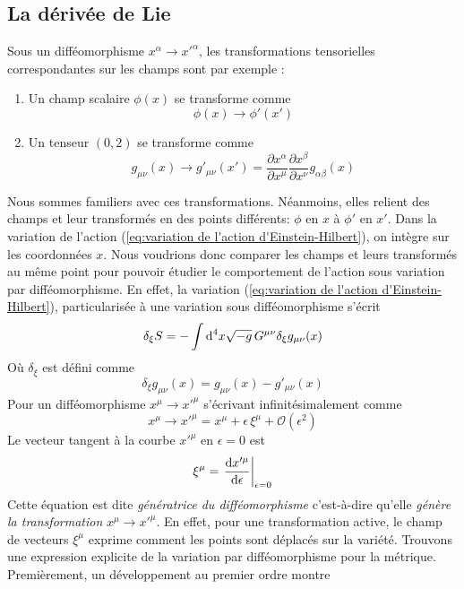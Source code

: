 \subsection{La dérivée de Lie}
Sous un difféomorphisme $x^{\alpha } \to x'^{\alpha }$, les transformations tensorielles correspondantes sur les champs sont par exemple :
\begin{enumerate}
    \item Un champ scalaire $\phi(x)$ se transforme comme
    \begin{equation}
        \phi(x) \to \phi'(x')
    \end{equation}
    \item Un tenseur $(0,2)$ se transforme comme
    \begin{equation}
        g_{\mu \nu}(x) \rightarrow g'_{\mu \nu}(x')= \frac{\partial x^{\alpha}}{\partial x^{\mu}}\frac{\partial x^{\beta}}{\partial x^{\nu}}g_{ \alpha \beta}(x)
    \end{equation}
\end{enumerate}
Nous sommes familiers avec ces transformations. Néanmoins, elles relient des champs et leur transformés en des points différents: $\phi$ en $x$ à $\phi'$ en $x'$. Dans la variation de l'action (\ref{eq:variation de l'action d'Einstein-Hilbert}), on intègre sur les coordonnées $x$. Nous voudrions donc comparer les champs et leurs transformés au même point pour pouvoir étudier le comportement de l'action sous variation par difféomorphisme. En effet, la variation (\ref{eq:variation de l'action d'Einstein-Hilbert}), particularisée à une variation sous difféomorphisme s'écrit 
\begin{equation}
    \delta_{\xi}S = - \int \mathrm{d}^4 x \sqrt{-g} \,G^{\mu \nu}\delta_{\xi}g_{\mu \nu}(x)
\end{equation}
Où $\delta_\xi$ est défini comme
\begin{equation}
    \delta_{\xi}g_{\mu \nu}(x) = g_{\mu \nu}(x) - g'_{\mu \nu}(x)
\end{equation}
Pour un difféomorphisme $x^{\mu} \to x'^{\mu}$ s'écrivant infinitésimalement comme 
\begin{equation}
    x^{\mu} \to x'^{\mu} = x^{\mu} + \epsilon \, \xi^{\mu} + \mathcal{O}(\epsilon^2)
\end{equation}
Le vecteur tangent à la courbe $x'^{\mu}$ en $\epsilon = 0$ est 
\begin{equation}
    \xi ^{\mu} = \left. \frac{\mathrm{d} x'^{\mu}}{\mathrm{d} \epsilon}\right|_{\epsilon = 0}
\end{equation}
Cette équation est dite \emph{génératrice du difféomorphisme} c'est-à-dire qu'elle \emph{génère la transformation} $x^{\mu} \rightarrow x'^{\mu}$. En effet, pour une transformation active, le champ de vecteurs $\xi^\mu$ exprime comment les points sont déplacés sur la variété. Trouvons une expression explicite de la variation par difféomorphisme pour la métrique. Premièrement, un développement au premier ordre montre 
